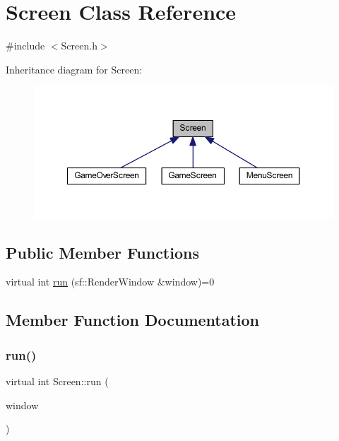 \hypertarget{class_screen}{}\section{Screen Class Reference}
\label{class_screen}


{\ttfamily \#include $<$Screen.\+h$>$}



Inheritance diagram for Screen\+:\nopagebreak
\begin{figure}[H]
\begin{center}
\leavevmode
\includegraphics[width=350pt]{class_screen__inherit__graph}
\end{center}
\end{figure}
\subsection*{Public Member Functions}
\begin{DoxyCompactItemize}
\item 
virtual int \hyperlink{class_screen_aac0f7f072481e517dafc85ad292d6f00}{run} (sf\+::\+Render\+Window \&window)=0
\end{DoxyCompactItemize}


\subsection{Member Function Documentation}
\mbox{\label{class_screen_aac0f7f072481e517dafc85ad292d6f00}} 
\subsubsection{\texorpdfstring{run()}{run()}}
{\footnotesize\ttfamily virtual int Screen\+::run (\begin{DoxyParamCaption}\item[{sf\+::\+Render\+Window \&}]{window }\end{DoxyParamCaption})\hspace{0.3cm}{\ttfamily [pure virtual]}}



